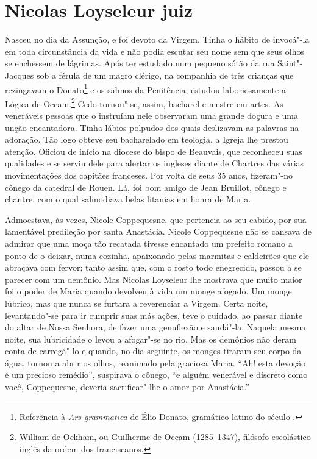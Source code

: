 \chapter{Nicolas Loyseleur juiz}

Nasceu no dia da Assunção, e foi devoto da Virgem. Tinha o hábito de
invocá"-la em toda circunstância da vida e não podia escutar seu nome sem
que seus olhos se enchessem de lágrimas. Após ter estudado num pequeno
sótão da rua Saint"-Jacques sob a férula de um magro clérigo, na companhia
de três crianças que rezingavam o Donato\footnote{ Referência à
\textit{Ars grammatica} de Élio Donato, gramático latino do século .} 
e os salmos da Penitência, estudou laboriosamente a Lógica de
Occam.\footnote{ William de Ockham, ou Guilherme de Occam (1285--1347),
filósofo escolástico inglês da ordem dos franciscanos.} Cedo
tornou"-se, assim, bacharel e mestre em artes. As veneráveis pessoas que o
instruíam nele observaram uma grande doçura e uma unção encantadora. Tinha
lábios polpudos dos quais deslizavam as palavras na adoração. Tão logo
obteve seu bacharelado em teologia, a Igreja lhe prestou atenção. Oficiou
de início na diocese do bispo de Beauvais, que reconheceu suas qualidades
e se serviu dele para alertar os ingleses diante de Chartres das várias
movimentações dos capitães franceses. Por volta de seus 35 anos,
fizeram"-no cônego da catedral de Rouen. Lá, foi bom amigo de Jean
Bruillot, cônego e chantre, com o qual salmodiava belas litanias em honra
de Maria.

Admoestava, às vezes, Nicole Coppequesne, que pertencia ao seu cabido, por
sua lamentável predileção por santa Anastácia. Nicole Coppequesne não se
cansava de admirar que uma moça tão recatada tivesse encantado um prefeito
romano a ponto de o deixar, numa cozinha, apaixonado pelas marmitas e
caldeirões que ele abraçava com fervor; tanto assim que, com o rosto todo
enegrecido, passou a se parecer com um demônio. Mas Nicolas Loyseleur lhe
mostrava que muito maior foi o poder de Maria quando devolveu à vida um
monge afogado. Um monge lúbrico, mas que nunca se furtara a reverenciar a
Virgem. Certa noite, levantando"-se para ir cumprir suas más ações, teve o
cuidado, ao passar diante do altar de Nossa Senhora, de fazer uma
genuflexão e saudá"-la. Naquela mesma noite, sua lubricidade o levou a
afogar"-se no rio. Mas os demônios não deram conta de carregá"-lo e quando,
no dia seguinte, os monges tiraram seu corpo da água, tornou a abrir os
olhos, reanimado pela graciosa Maria. “Ah! esta devoção é um precioso
remédio'', suspirava o cônego, ``e alguém venerável e discreto como você,
Coppequesne, deveria sacrificar"-lhe o amor por Anastácia.”


